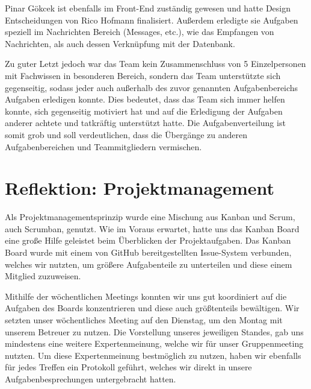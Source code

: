 Pinar Gökcek ist ebenfalls im Front-End zuständig gewesen und hatte Design Entscheidungen von Rico Hofmann finalisiert.
Außerdem erledigte sie Aufgaben speziell im Nachrichten Bereich (Messages, etc.), wie das Empfangen von Nachrichten, als auch dessen Verknüpfung mit der Datenbank.

Zu guter Letzt jedoch war das Team kein Zusammenschluss von 5 Einzelpersonen mit Fachwissen in besonderen Bereich, sondern das Team unterstützte sich gegenseitig, sodass jeder auch außerhalb des zuvor genannten Aufgabenbereichs Aufgaben erledigen konnte.
Dies bedeutet, dass das Team sich immer helfen konnte, sich gegenseitig motiviert hat und auf die Erledigung der Aufgaben anderer achtete und tatkräftig unterstützt hatte.
Die Aufgabenverteilung ist somit grob und soll verdeutlichen, dass die Übergänge zu anderen Aufgabenbereichen und Teammitgliedern vermischen.

\section{Reflektion: Projektmanagement}

Als Projektmanagementsprinzip wurde eine Mischung aus Kanban und Scrum, auch Scrumban, genutzt.
Wie im Voraus erwartet, hatte uns das Kanban Board eine große Hilfe geleistet beim Überblicken der Projektaufgaben.
Das Kanban Board wurde mit einem von GitHub bereitgestellten Issue-System verbunden, welches wir nutzten, um größere Aufgabenteile zu unterteilen und diese einem Mitglied zuzuweisen.

Mithilfe der wöchentlichen Meetings konnten wir uns gut koordiniert auf die Aufgaben des Boards konzentrieren und diese auch größtenteils bewältigen.
Wir setzten unser wöchentliches Meeting auf den Dienstag, um den Montag mit unserem Betreuer zu nutzen.
Die Vorstellung unseres jeweiligen Standes, gab uns mindestens eine weitere Expertenmeinung, welche wir für unser Gruppenmeeting nutzten.
Um diese Expertenmeinung bestmöglich zu nutzen, haben wir ebenfalls für jedes Treffen ein Protokoll geführt, welches wir direkt in unsere Aufgabenbesprechungen untergebracht hatten.


